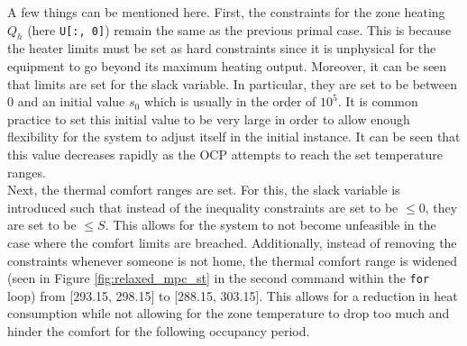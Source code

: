 A few things can be mentioned here. First, the constraints for the zone heating $Q_h$ (here \texttt{U[:, 0]}) remain the same as the previous primal case. This is because the heater limits must be set as hard constraints since it is unphysical for the equipment to go beyond its maximum heating output. Moreover, it can be seen that limits are set for the slack variable. In particular, they are set to be between 0 and an initial value $s_0$ which is usually in the order of $10^5$. It is common practice to set this initial value to be very large in order to allow enough flexibility for the system to adjust itself in the initial instance. It can be seen that this value decreases rapidly as the OCP attempts to reach the set temperature ranges. \\

Next, the thermal comfort ranges are set. For this, the slack variable is introduced such that instead of the inequality constraints are set to be $\leq 0$, they are set to be $\leq S$. This allows for the system to not become unfeasible in the case where the comfort limits are breached. Additionally, instead of removing the constraints whenever someone is not home, the thermal comfort range is widened (seen in Figure \ref{fig:relaxed_mpc_st} in the second command within the \texttt{for} loop) from [293.15, 298.15] to [288.15, 303.15]. This allows for a reduction in heat consumption while not allowing for the zone temperature to drop too much and hinder the comfort for the following occupancy period.\\




